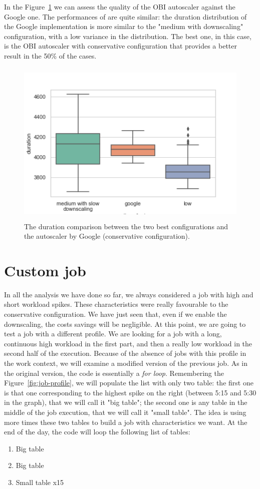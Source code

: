 \documentclass[12pt,twoside,cucitura]{toptesi}
\begin{document}
In the Figure~\ref{fig:google-duration} we can assess the quality of the OBI autoscaler against the Google one. The performances of are quite similar: the duration distribution of the Google implementation is more similar to the "medium with downscaling" configuration, with a low variance in the distribution. The best one, in this case, is the OBI autoscaler with conservative configuration that provides a better result in the 50\% of the cases. 
\begin{figure}
\centering
\includegraphics[height=80mm]{google-duration}
\caption{The duration comparison between the two best configurations and the autoscaler by Google (conservative configuration).}\label{fig:google-duration}
\end{figure}

\section{Custom job}
In all the analysis we have done so far, we always considered a job with high and short workload spikes. These characteristics were really favourable to the conservative configuration. We have just seen that, even if we enable the downscaling, the costs savings will be negligible. At this point, we are going to test a job with a different profile. We are looking for a job with a long, continuous high workload in the first part, and then a really low workload in the second half of the execution. Because of the absence of jobs with this profile in the work context, we will examine a modified version of the previous job. As in the original version, the code is essentially a \textit{for loop}. Remembering the Figure~\ref{fig:job-profile}, we will populate the list with only two table: the first one is that one corresponding to the highest spike on the right (between 5:15 and 5:30 in the graph), that we will call it "big table"; the second one is any table in the middle of the job execution, that we will call it "small table". The idea is using more times these two tables to build a job with characteristics we want. At the end of the day, the code will loop the following list of tables:
\begin{enumerate}
	\item Big table
	\item Big table
	\item Small table x15
\end{enumerate}
\end{document}
